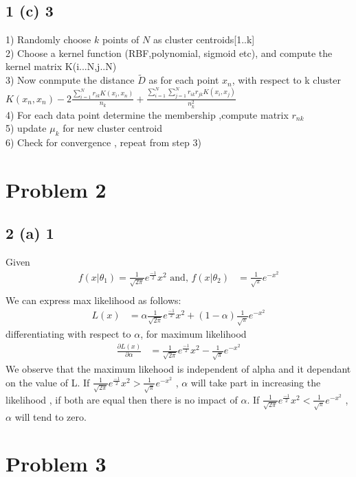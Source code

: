 \documentclass[10pt,letterpaper]{article}
\begin{document}
\subsection{1 (c) 3}
1)  Randomly choose  $k$ points of $N$ as cluster centroids[1..k] \\
2)  Choose a kernel function (RBF,polynomial, sigmoid etc),  and compute the kernel matrix K(i...N,j..N)\\
3)  Now conmpute the distance $\tilde{D}$ as for each point $x_n$, with respect to k cluster\\
	$ K(x_n,x_n) -2 \frac{\sum_{i=1}^N r_{ik} K(x_i, x_n)}{n_k} + \frac{\sum_{i=1}^N \sum_{j=1}^Nr_{ik}r_{jk}K(x_i,x_j)}{n_k^2}$\\
4) For each data point determine the membership ,compute matrix $r_{nk}$\\
5) update $\mu_k$ for new cluster centroid\\
6) Check for convergence , repeat from step 3)
	

\section{Problem 2}
\subsection{2 (a) 1}
Given
\begin{align*}
f(x|\theta_1)= \frac{1}{\sqrt{2\pi}} e^\frac{-1}{2}x^2  \text{  and, } f(x|\theta_2)&= \frac{1}{\sqrt{\pi}} e^{-x^2}\\
\end{align*}
We can express max likelihood as follows: 
\begin{align*}
L(x)&= \alpha  \frac{1}{\sqrt{2\pi}} e^\frac{-1}{2}x^2 + (1-\alpha)\frac{1}{\sqrt{\pi}} e^{-x^2}
\end{align*}
differentiating with respect to $\alpha$, for maximum likelihood
\begin{align*}
\frac{\partial L(x)}{\partial \alpha}&=   \frac{1}{\sqrt{2\pi}} e^\frac{-1}{2}x^2 -\frac{1}{\sqrt{\pi}} e^{-x^2}
\end{align*}
We observe that the maximum likehood is independent of alpha and it dependant on the value of L.
If $\frac{1}{\sqrt{2\pi}} e^\frac{-1}{2}x^2 > \frac{1}{\sqrt{\pi}} e^{-x^2}$ ,  $\alpha$ will take part in increasing the likelihood , if both are equal then there is no impact of $\alpha$. If $\frac{1}{\sqrt{2\pi}} e^\frac{-1}{2}x^2 < \frac{1}{\sqrt{\pi}} e^{-x^2}$ ,  $\alpha$ will tend to zero.
\section{Problem 3}
\end{document}
